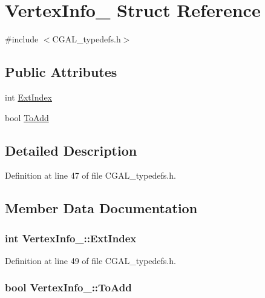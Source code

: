 \hypertarget{struct_vertex_info__2}{}\section{Vertex\+Info\+\_ Struct Reference}
\label{struct_vertex_info__2}


{\ttfamily \#include $<$C\+G\+A\+L\+\_\+typedefs.\+h$>$}

\subsection*{Public Attributes}
\begin{DoxyCompactItemize}
\item 
int \hyperlink{struct_vertex_info__2_a05194a9f80df0a1b597822414be4e4fe}{Ext\+Index}
\item 
bool \hyperlink{struct_vertex_info__2_a4b758c2b7d1e13fa77325f2a9de2c0a8}{To\+Add}
\end{DoxyCompactItemize}


\subsection{Detailed Description}


Definition at line 47 of file C\+G\+A\+L\+\_\+typedefs.\+h.



\subsection{Member Data Documentation}
\hypertarget{struct_vertex_info__2_a05194a9f80df0a1b597822414be4e4fe}{}
\subsubsection[{Ext\+Index}]{\setlength{\rightskip}{0pt plus 5cm}int Vertex\+Info\+\_\+::\+Ext\+Index}\label{struct_vertex_info__2_a05194a9f80df0a1b597822414be4e4fe}


Definition at line 49 of file C\+G\+A\+L\+\_\+typedefs.\+h.

\hypertarget{struct_vertex_info__2_a4b758c2b7d1e13fa77325f2a9de2c0a8}{}
\subsubsection[{To\+Add}]{\setlength{\rightskip}{0pt plus 5cm}bool Vertex\+Info\+\_\+::\+To\+Add}\label{struct_vertex_info__2_a4b758c2b7d1e13fa77325f2a9de2c0a8}


